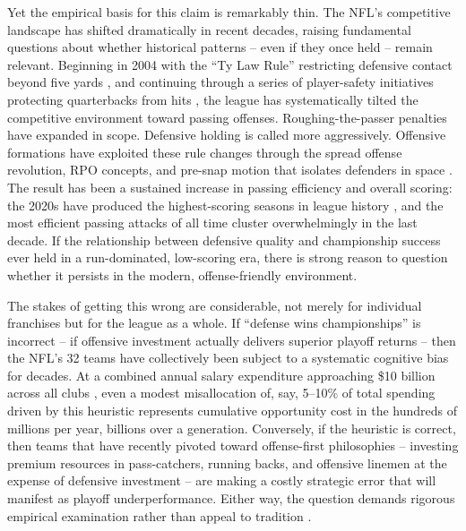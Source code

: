 Yet the empirical basis for this claim is remarkably thin. The NFL's competitive landscape has shifted dramatically in recent decades, raising fundamental questions about whether historical patterns  -- even if they once held  -- remain relevant. Beginning in 2004 with the ``Ty Law Rule'' restricting defensive contact beyond five yards \parencite{nflops2004rules}, and continuing through a series of player-safety initiatives protecting quarterbacks from hits \parencite{pereira2018roughing}, the league has systematically tilted the competitive environment toward passing offenses. Roughing-the-passer penalties have expanded in scope. Defensive holding is called more aggressively. Offensive formations have exploited these rule changes through the spread offense revolution, RPO concepts, and pre-snap motion that isolates defenders in space \parencite{barnwell2019passingrevolution}. The result has been a sustained increase in passing efficiency and overall scoring: the 2020s have produced the highest-scoring seasons in league history \parencite{nflscoring2023trends}, and the most efficient passing attacks of all time cluster overwhelmingly in the last decade. If the relationship between defensive quality and championship success ever held in a run-dominated, low-scoring era, there is strong reason to question whether it persists in the modern, offense-friendly environment.

The stakes of getting this wrong are considerable, not merely for individual franchises but for the league as a whole. If ``defense wins championships'' is incorrect  -- if offensive investment actually delivers superior playoff returns  -- then the NFL's 32 teams have collectively been subject to a systematic cognitive bias for decades. At a combined annual salary expenditure approaching \$10 billion across all clubs \parencite{spotrac2025nflcaps}, even a modest misallocation of, say, 5--10\% of total spending driven by this heuristic represents cumulative opportunity cost in the hundreds of millions per year, billions over a generation. Conversely, if the heuristic is correct, then teams that have recently pivoted toward offense-first philosophies  -- investing premium resources in pass-catchers, running backs, and offensive linemen at the expense of defensive investment  -- are making a costly strategic error that will manifest as playoff underperformance. Either way, the question demands rigorous empirical examination rather than appeal to tradition \parencite{borghesi2008allocation,mulholland2019optimizing}.

